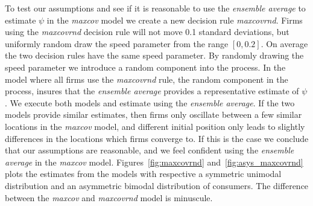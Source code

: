 \documentclass[preprint, 12pt]{elsarticle}
\begin{document}
To test our assumptions and see if it is reasonable to use the \emph{ensemble average} to estimate $\psi$ in the \emph{maxcov} model we create a new decision rule \emph{maxcovrnd}. Firms using the \emph{maxcovrnd} decision rule will not move 0.1 standard deviations, but uniformly random draw the speed parameter from the range $[0, 0.2]$. On average the two decision rules have the same speed parameter. By randomly drawing the speed parameter we introduce a random component into the process. In the model where all firms use the \emph{maxcovrnd} rule, the random component in the process, insures that the \emph{ensemble average} provides a representative estimate of $\psi$. We execute both models and estimate using the \emph{ensemble average}. If the two models provide similar estimates, then firms only oscillate between a few similar locations in the \emph{maxcov} model, and different initial position only leads to slightly differences in the locations which firms converge to. If this is the case we conclude that our assumptions are reasonable, and we feel confident using the \emph{ensemble average} in the \emph{maxcov} model. Figures~\ref{fig:maxcovrnd} and~\ref{fig:asys_maxcovrnd} plots the estimates from the models with respective a symmetric unimodal distribution and an asymmetric bimodal distribution of consumers. The difference between the \emph{maxcov} and \emph{maxcovrnd} model is minuscule.
\end{document}
